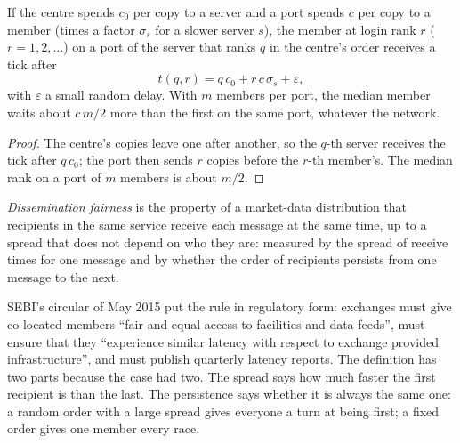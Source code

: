 \begin{proposition}\label{prop:nw:the-asia-pacific-map:seq}
If the centre spends $c_0$ per copy to a server and a port spends $c$ per copy to a member (times a factor $\sigma_s$ for a slower server $s$),
the member at login rank $r$ ($r = 1, 2, \dots$) on a port of the server that ranks $q$ in the centre's order receives a tick after
\[
  t(q, r) = q\,c_0 + r\,c\,\sigma_s + \varepsilon,
\]
with $\varepsilon$ a small random delay. With $m$ members per port, the median member waits about $c\,m/2$ more than the first on the same
port, whatever the network.
\end{proposition}

\begin{proof}
The centre's copies leave one after another, so the $q$-th server receives the tick after $q\,c_0$; the port then sends $r$ copies before
the $r$-th member's. The median rank on a port of $m$ members is about $m/2$.
\end{proof}

\begin{definition}\label{def:nw:the-asia-pacific-map:fair}
\emph{Dissemination fairness} is the property of a market-data distribution that recipients in the same
service receive each message at the same time, up to a spread that does not depend on who they are: measured by the spread of receive
times for one message and by whether the order of recipients persists from one message to the next.
\end{definition}

SEBI's circular of May 2015 put the rule in regulatory form: exchanges must give co-located members ``fair and equal access to facilities
and data feeds'', must ensure that they ``experience similar latency with respect to exchange provided infrastructure'', and must publish
quarterly latency reports. The definition has two parts because the case had two. The spread says how much faster the first recipient is
than the last. The persistence says whether it is always the same one: a random order with a large spread gives everyone a turn at being
first; a fixed order gives one member every race.

\label{lst:nw:the-asia-pacific-map:unicast}

